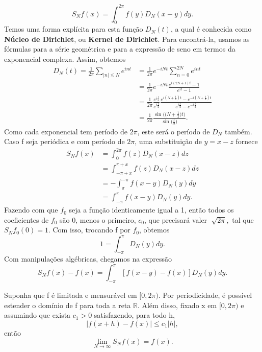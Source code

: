 \documentclass[measure_theory.tex]{subfiles}
\begin{document}
\[
	S_{N}f(x) = \int_{0}^{2\pi }f(y)D_{N}(x-y)dy.
\]
Temos uma forma explícita para esta função \(D_{N}(t)\), a qual é conhecida como \textbf{Núcleo de Dirichlet}, ou \textbf{Kernel de Dirichlet}. Para encontrá-la, usamos as fórmulas para a série geométrica
e para a expressão de seno em termos da exponencial complexa. Assim, obtemos
\begin{align*}
	D_{N}(t) = \frac{1}{2\pi }\sum\limits_{|n|\leq N}^{}e^{int} & = \frac{1}{2\pi }e^{-iNt}\sum\limits_{n=0}^{2N}e^{int}                                                                                                  \\
	                                                            & = \frac{1}{2\pi }e^{-iNt}\frac{e^{i(2N+1)t}-1}{e^{it}-1}                                                                                                \\
	                                                            & = \frac{1}{2\pi }\frac{e^{i \frac{t}{2}}}{e^{i \frac{t}{2}}}\frac{e^{i(N+\frac{1}{2})t}-e^{-i(N+\frac{1}{2})t}}{e^{i \frac{t}{2}} - e^{-i \frac{t}{2}}} \\
	                                                            & = \frac{1}{2\pi }\frac{\sin^{}{\biggl(\biggl(N+\frac{1}{2}\biggr)t\biggr)}}{\sin^{}{\biggl(\frac{t}{2}\biggr)}}.
\end{align*}
Como cada exponencial tem período de \(2\pi \), este será o período de \(D_{N}\) também. Caso f seja periódica e com período de \(2\pi \), uma substituição de \(y = x - z\) fornece
\begin{align*}
	S_{N}f(x) & = \int_{0}^{2\pi }f(z)D_{N}(x-z)dz          \\
	          & = \int_{-\pi + x}^{\pi + x}f(z)D_{N}(x-z)dz \\
	          & = - \int_{\pi }^{-\pi }f(x-y)D_{N}(y)dy     \\
	          & = \int_{-\pi }^{\pi }f(x-y)D_{N}(y)dy.
\end{align*}
Fazendo com que \(f_{0}\) seja a função identicamente igual a 1, então todos os coeficientes de \(f_{0}\) são 0, menos o primeiro, \(c_{0}\), que precisará valer \(\sqrt[]{2\pi },\) tal que \(S_{N}f_{0}(0) = 1.\)
Com isso, trocando f por \(f_{0}\), obtemos
\[
	1 = \int_{-\pi }^{\pi }D_{N}(y)dy.
\]
Com manipulações algébricas, chegamos na expressão
\[
	S_{N}f(x) - f(x) = \int_{-\pi }^{\pi }[f(x-y) - f(x)]D_{N}(y)dy.
\]
\begin{theorem*}
	Suponha que f é limitada e mensurável em \([0, 2\pi ).\) Por periodicidade, é possível estender o domínio de f para toda a reta \(\mathbb{R}\). Além disso, fixado x
	em \([0, 2\pi )\) e assumindo que exista \(c_1 > 0\) satisfazendo, para todo h,
	\[
		|f(x+h) - f(x)|\leq c_{1}|h|,
	\]
	então
	\[
		\lim_{N\to \infty}S_{N}f(x) = f(x).
	\]
\end{theorem*}
\end{document}
